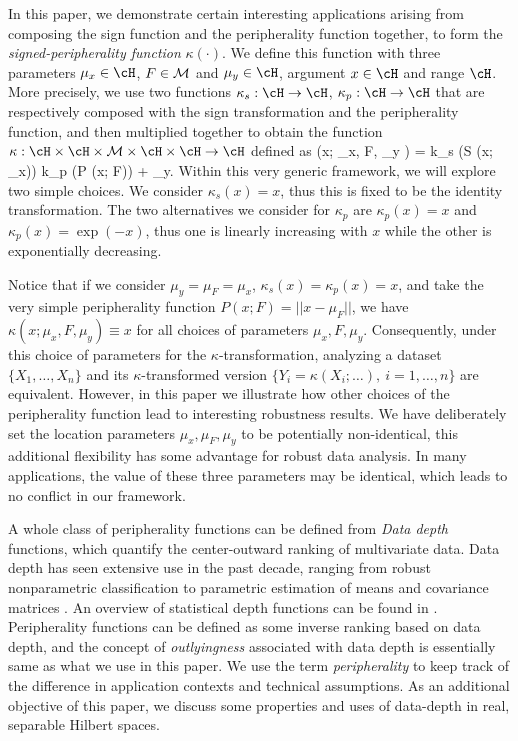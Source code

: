 \documentclass[fleqn,11pt]{article}
\begin{document}
In this paper, we demonstrate certain interesting applications arising from 
composing the sign function and the peripherality function together, to form the 
{\it signed-peripherality function} $\kappa (\cdot)$. We define this function 
with three parameters $\mu_{x} \in \cH$, $F \in {\cal{M}}$ and  
$\mu_{y} \in \cH$,  argument $x \in \cH$ and range $\cH$. More precisely,
we use two functions $\kappa_{s} : \cH \rightarrow \cH$, 
$\kappa_{p} : \cH \rightarrow \cH$ that are respectively 
composed with the sign transformation and the peripherality function, and 
then multiplied together to obtain the function
$\kappa : \cH \times \cH \times \cM \times \cH \times \cH \rightarrow \cH$ 
defined as 
\ban 
\kappa (x; \mu_{x}, F, \mu_{y} ) = k_{s} (S (x; \mu_{x})) k_{p} (P (x; F)) + \mu_{y}. 
\ean
Within this very generic framework, we will explore two simple choices. We consider 
$\kappa_{s} (x) = x$, thus this is fixed to be the identity transformation. The two 
alternatives we consider for $\kappa_{p}$ are 
$\kappa_{p} (x) = x$ and $\kappa_{p} (x) = \exp (- x)$, thus one is linearly 
increasing with $x$ while the other is exponentially decreasing.


Notice that if we consider $\mu_{y} = \mu_{F} = \mu_{x}$,  
$\kappa_{s} (x) = \kappa_{p} (x) = x$, and take the very 
simple peripherality  function $P( x; F) = || x - \mu_{F} ||$, we have 
$\kappa (x; \mu_{x}, F, \mu_{y} ) \equiv x$ for all choices of parameters 
$\mu_{x}, F, \mu_{y}$.  Consequently, under this choice of parameters for the 
$\kappa$-transformation, analyzing a dataset $\{ X_{1}, \ldots, X_{n} \}$ and 
its $\kappa$-transformed version 
$\{ Y_{i} = \kappa (X_{i}; \ldots), \ i = 1, \ldots, n \}$ are equivalent. However,
in this paper we illustrate how other choices of the peripherality function 
lead to interesting robustness results. We have deliberately set the location 
parameters $\mu_{x}, \mu_{F}, \mu_{y}$ to be potentially non-identical, this 
additional flexibility has some advantage for robust data analysis. In many 
applications, the value of these three parameters may be identical, which leads 
to no conflict in our framework.

A whole class of peripherality functions can be defined from {\it Data depth} functions, which quantify the center-outward ranking of multivariate data. Data depth has seen extensive use in the past decade, ranging from robust nonparametric classification \citep{jornsten04, ghosh05, dutta12, sguera14} to parametric estimation of means \citep{ZuoCuiHe04} and covariance matrices \citep{ZuoCui05}. An overview of statistical depth functions can be found in \citep{zuo00}. Peripherality functions can be defined as some inverse ranking based on data depth, and the concept of {\it outlyingness} associated with data depth is essentially same as what we use in this paper. We use the term {\it peripherality} to keep track of the difference in application contexts and technical assumptions. As an additional objective of this paper, we discuss  some properties and uses of data-depth in real, separable Hilbert spaces.
\end{document}
